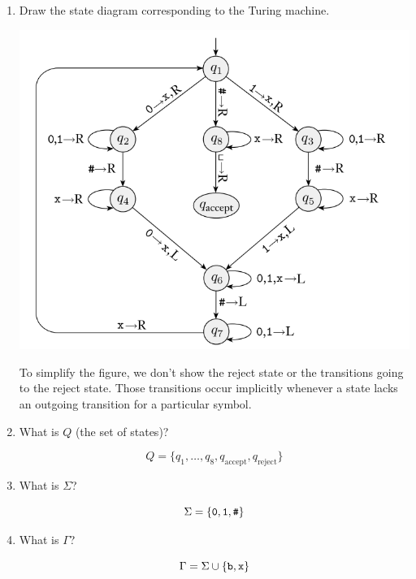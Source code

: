 \documentclass[letterpaper]{article}
\begin{document}
\begin{enumerate}
    \item Draw the state diagram corresponding to the Turing machine. 
    \begin{mdframed}[]
        \begin{center}
            \includegraphics[scale=0.7]{../assets/turing_1.png}
        \end{center}

        To simplify the figure, we don't show the reject state or the transitions going to the reject state. Those transitions occur implicitly whenever a state lacks an outgoing transition for a particular symbol.
    \end{mdframed}

    \item What is $Q$ (the set of states)?
    \begin{mdframed}[]
        \[Q = \{q_1, \dots, q_8, q_{\text{accept}}, q_{\text{reject}}\}\]
    \end{mdframed}

    \item What is $\Sigma$?
    \begin{mdframed}[]
        \[\Sigma = \{\texttt{0}, \texttt{1}, \texttt{\#}\}\]
    \end{mdframed}

    \item What is $\Gamma$?
    \begin{mdframed}[]
        \[\Gamma = \Sigma \cup \{\texttt{b}, \texttt{x}\}\]
    \end{mdframed}


\end{enumerate}
\end{document}

